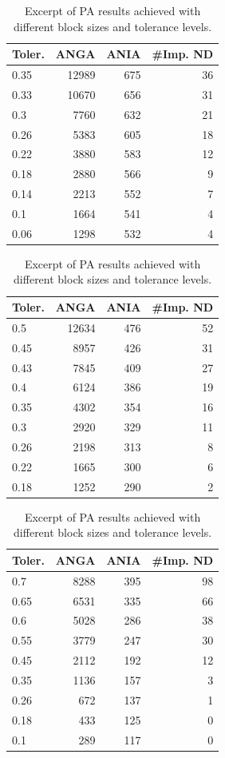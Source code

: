 \begin{table}[h]
\centering
\begin{subtable}[h]{0.45\textwidth}
\begin{tabular}{lrrr}
\hline
Toler. & ANGA  & ANIA & \#Imp. ND  \\ \hline
0.35 & 12989 & 675 & 36 \\
0.33 & 10670 & 656 & 31 \\
0.3  & 7760  & 632 & 21 \\
0.26 & 5383  & 605 & 18 \\
0.22 & 3880  & 583 & 12 \\
0.18 & 2880  & 566 & 9  \\
0.14 & 2213  & 552 & 7  \\
0.1  & 1664  & 541 & 4  \\
0.06 & 1298  & 532 & 4
 \end{tabular}
 \caption{Block size 500.}
 \label{tab:PA-block-size-500}
\end{subtable}
\hfill
\begin{subtable}[h]{0.45\textwidth}
\centering
\begin{tabular}{lrrr}
\hline
Toler. & ANGA  & ANIA & \#Imp. ND \\ \hline
0.5  & 12634 & 476 & 52 \\
0.45 & 8957  & 426 & 31 \\
0.43 & 7845	 & 409 & 27 \\
0.4  & 6124  & 386 & 19 \\
0.35 & 4302  & 354 & 16 \\
0.3  & 2920  & 329 & 11 \\
0.26 & 2198  & 313 & 8  \\
0.22 & 1665  & 300 & 6  \\
0.18 & 1252  & 290 & 2  
\end{tabular}
\caption{Block size 250.}
\label{tab:PA-block-size-250}
\end{subtable}

\begin{subtable}[h]{0.45\textwidth}
\centering
\begin{tabular}{lrrr}
\hline
Toler. & ANGA  & ANIA & \#Imp. ND \\ \hline
0.7  & 8288 & 395 & 98 \\
0.65 & 6531 & 335 & 66 \\
0.6  & 5028 & 286 & 38 \\
0.55 & 3779 & 247 & 30 \\
0.45 & 2112 & 192 & 12 \\
0.35 & 1136 & 157 & 3  \\
0.26 & 672  & 137 & 1  \\
0.18 & 433  & 125 & 0  \\
0.1  & 289  & 117 & 0  
\end{tabular}
\caption{Block size 100.}
\label{tab:PA-block-size-100}
\end{subtable}

\caption{Excerpt of PA results achieved with different block sizes and tolerance levels.}
\label{tab:PA-block-sizes}
\end{table}


